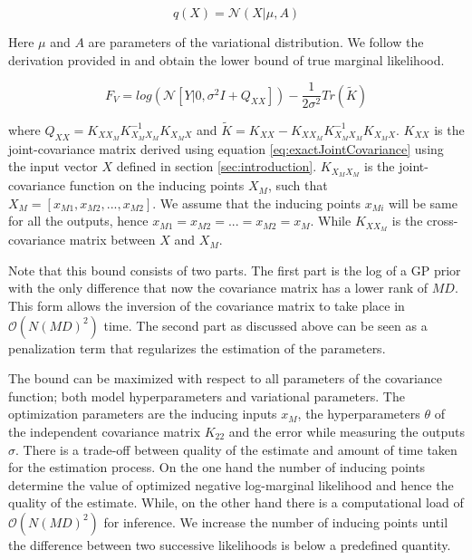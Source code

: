 \begin{equation}\label{eq:multiVariationalQ}
 q(X) = \mathcal{N}(X|  \mu, A)
\end{equation}
 
Here \(\mu\) and \(A\) are parameters of the variational distribution. We follow the derivation provided in \cite{Titsias09variationallearning} and obtain the lower bound of true marginal likelihood.

\begin{equation}\label{eq:lowerBoundMultiVarNLML}
F_{V} = log(\mathcal{N}[Y| 0, \sigma ^{2}I + Q_{XX}]) - \frac{1}{2\sigma ^{2}}Tr(\tilde{K})
\end{equation}

where \(Q_{XX} = K_{XX_{M}}K_{X_{M}X_{M}}^{-1}K_{X_{M}X}\) and \(\tilde{K} = K_{XX} - K_{XX_{M}}K_{X_{M}X_{M}}^{-1}K_{X_{M}X}\). \(K_{XX}\) is the joint-covariance matrix derived using equation \ref{eq:exactJointCovariance} using the input vector \(X\) defined in section \ref{sec:introduction}. \(K_{X_{M}X_{M}}\) is the joint-covariance function on the inducing points \(X_{M}\), such that \(X_{M} = [x_{M1}, x_{M2}, ..., x_{M2}]\). We assume that the inducing points \(x_{Mi}\) will be same for all the outputs, hence \(x_{M1} = x_{M2} = ... = x_{M2} = x_{M}\). While \(K_{XX_{M}}\) is the cross-covariance matrix between \(X\) and \(X_{M}\). 

Note that this bound consists of two parts. The first part is the log of a GP prior with the only difference that now the covariance matrix has a lower rank of \(MD\). This form allows the inversion of the covariance matrix to take place in \(\mathcal{O}\left ( N(MD)^{2} \right )\) time. The second part as discussed above can be seen as a penalization term that regularizes the estimation of the parameters. 

The bound can be maximized with respect to all parameters of the covariance function; both model hyperparameters and variational parameters. The optimization parameters are the inducing inputs \(x_{M}\), the hyperparameters \(\theta\) of the independent covariance matrix \(K_{22}\) and the error while measuring the outputs \(\sigma\). There is a trade-off between quality of the estimate and amount of time taken for the estimation process. On the one hand the number of inducing points determine the value of optimized negative log-marginal likelihood and hence the quality of the estimate. While, on the other hand there is a computational load of \(\mathcal{O}\left ( N(MD)^{2} \right )\) for inference. We increase the number of inducing points until the difference between two successive likelihoods is below a predefined quantity.   

